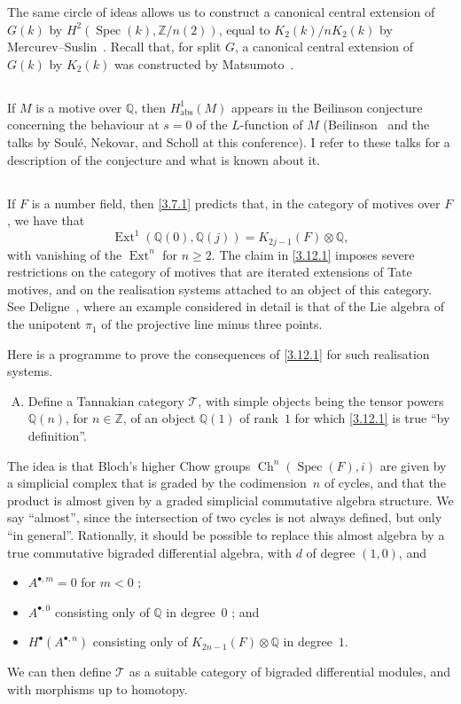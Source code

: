 \documentclass{article}
\theoremstyle{plain}
\theoremstyle{definition}
\newcommand{\sh}{\mathscr}
\newcommand{\ZZ}{\mathbb{Z}}
\newcommand{\QQ}{\mathbb{Q}}
\newcommand{\abs}{\mathrm{abs}}
\renewcommand{\geq}{\geqslant}
\DeclareMathOperator{\Ext}{Ext}
\DeclareMathOperator{\Spec}{Spec}
\DeclareMathOperator{\Ch}{Ch}
\newcommand{\oldpage}[1]{\marginpar{\footnotesize$\Big\vert$ \textit{p.~#1}}}
\begin{document}
The same circle of ideas allows us to construct a canonical central extension of $G(k)$ by $H^2(\Spec(k),\ZZ/n(2))$, equal to $K_2(k)/nK_2(k)$ by Mercurev--Suslin~\cite{27}.
Recall that, for split $G$, a canonical central extension of $G(k)$ by $K_2(k)$ was constructed by Matsumoto~\cite[5.11]{25}.


\subsection{}
\label{3.11}

If $M$ is a motive over $\QQ$, then $H_\abs^1(M)$ appears in the Beilinson conjecture concerning the behaviour at $s=0$ of the $L$-function of $M$ (Beilinson~\cite{2} and the talks by Soul\'{e}, Nekovar, and Scholl at this conference).
I refer to these talks for a description of the conjecture and what is known about it.


\subsection{}
\label{3.12}

If $F$ is a number field, then \cref{3.7.1} predicts that, in the category of motives over $F$, we have that
\[
\label{3.12.1}
  \Ext^1(\QQ(0),\QQ(j)) = K_{2j-1}(F)\otimes\QQ,
\tag{3.12.1}
\]
with vanishing of the $\Ext^n$ for $n\geq2$.
The claim in \cref{3.12.1} imposes severe restrictions on the category of motives that are iterated extensions of Tate motives, and on the realisation systems attached to an object of this category.
See Deligne~\cite{14}, where an example considered in detail is that of the Lie algebra of the unipotent $\pi_1$ of the projective line minus three points.

\oldpage{160}
Here is a programme to prove the consequences of \cref{3.12.1} for such realisation systems.
\begin{enumerate}[(A)]
  \item Define a Tannakian category $\sh{T}$, with simple objects being the tensor powers $\QQ(n)$, for $n\in\ZZ$, of an object $\QQ(1)$ of rank~$1$ for which \cref{3.12.1} is true ``by definition''.
\end{enumerate}

The idea is that Bloch's higher Chow groups $\Ch^n(\Spec(F),i)$ are given by a simplicial complex that is graded by the codimension~$n$ of cycles, and that the product is almost given by a graded simplicial commutative algebra structure.
We say ``almost'', since the intersection of two cycles is not always defined, but only ``in general''.
Rationally, it should be possible to replace this almost algebra by a true commutative bigraded differential algebra, with $d$ of degree $(1,0)$, and
\begin{itemize}
  \item $A^{\bullet,m}=0$ for $m<0$ ;
  \item $A^{\bullet,0}$ consisting only of $\QQ$ in degree~$0$ ; and
  \item $H^\bullet(A^{\bullet,n})$ consisting only of $K_{2n-1}(F)\otimes\QQ$ in degree~$1$.
\end{itemize}
We can then define $\sh{T}$ as a suitable category of bigraded differential modules, and with morphisms up to homotopy.
\end{document}

